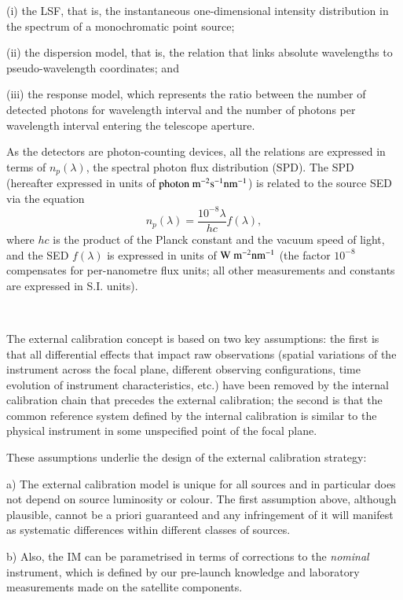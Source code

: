 \documentclass{aa}
\begin{document}
    (i) the LSF, that is, the instantaneous one-dimensional intensity distribution in the spectrum of a monochromatic point source;

    (ii) the dispersion model, that is, the relation that links absolute wavelengths to pseudo-wavelength coordinates; and

    (iii)  the response model, which represents the ratio between the number of detected photons for wavelength interval and the number of photons per wavelength interval entering the telescope aperture.

As the detectors are photon-counting devices, all the relations are expressed in terms of $n_p(\lambda)$, the spectral photon flux distribution (SPD).
The SPD (hereafter expressed in units of $\rm photon~ m^{-2} s^{-1} nm^{-1}$) is related to the source SED via the equation
\begin{equation}
    n_p(\lambda) = \frac{10^{-8}\lambda}{hc} f(\lambda)
,\end{equation}
where $hc$ is the product of the Planck constant and the vacuum speed of light, and the SED $f(\lambda)$ is expressed in units of $\rm W ~m^{-2} nm^{-1}$ (the factor $10^{-8}$ compensates for per-nanometre flux units; all other measurements and constants are expressed in S.I. units).
\par~\par
The external calibration concept is based on two key assumptions: 
the first is that  all differential effects that impact raw observations (spatial variations of the instrument across the focal plane, different observing configurations, time evolution of instrument characteristics, etc.)  have been removed by the internal calibration chain \citep{DeAngeli2022} that precedes the external calibration; 
the second is that the common reference system defined by the internal calibration is similar to the physical instrument in some unspecified point of the focal plane.

These assumptions underlie the design of the external calibration strategy:
   
   a) The external calibration model is unique for all sources and in particular does not depend on source luminosity or colour. The first assumption above, although plausible, cannot be a priori guaranteed and any infringement of it will manifest as systematic differences within different classes of sources.
   
   b) Also, the IM can be parametrised in terms of corrections to the \textit{nominal} instrument, which is defined by our pre-launch knowledge and laboratory measurements made on the satellite components.
\end{document}

